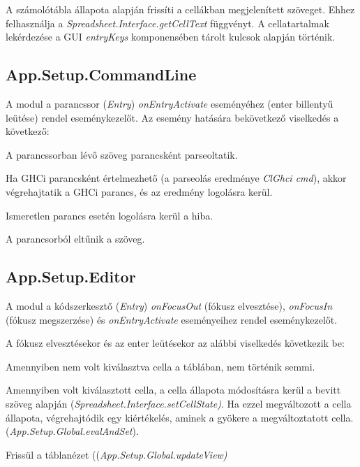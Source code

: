 A számolótábla állapota alapján frissíti a cellákban megjelenített szöveget. Ehhez felhasználja a \textit{Spreadsheet.Interface.getCellText} függvényt. A cellatartalmak lekérdezése a GUI \textit{entryKeys} komponensében tárolt kulcsok alapján történik.

\subsection{App.Setup.CommandLine}

A modul a parancssor (\textit{Entry}) \textit{onEntryActivate} eseményéhez (enter billentyű leütése) rendel eseménykezelőt. Az esemény hatására bekövetkező viselkedés a következő:
\begin{compactenum}
	\item A parancssorban lévő szöveg parancsként parseoltatik.
	\item Ha GHCi parancsként értelmezhető (a parseolás eredménye \textit{ClGhci cmd}), akkor végrehajtatik a GHCi parancs, és az eredmény logolásra kerül.
	\item Ismeretlen parancs esetén logolásra kerül a hiba.
	\item A parancsorból eltűnik a szöveg.
\end{compactenum}

\subsection{App.Setup.Editor}

A modul a kódszerkesztő (\textit{Entry}) \textit{onFocusOut} (fókusz elvesztése), \textit{onFocusIn} (fókusz megszerzése) és \textit{onEntryActivate} eseményeihez rendel eseménykezelőt.

A fókusz elvesztésekor és az enter leütésekor az alábbi viselkedés következik be:
\begin{compactenum}
	\item Amennyiben nem volt kiválasztva cella a táblában, nem történik semmi.
	\item Amennyiben volt kiválasztott cella, a cella állapota módosításra kerül a bevitt szöveg alapján (\mbox{\textit{Spreadsheet.Interface.setCellState)}}. Ha ezzel megváltozott a cella állapota, végrehajtódik egy kiértékelés, aminek a gyökere a megváltoztatott cella. (\mbox{\textit{App.Setup.Global.evalAndSet}}).
	\item Frissül a táblanézet ((\mbox{\textit{App.Setup.Global.updateView)}}
\end{compactenum}

